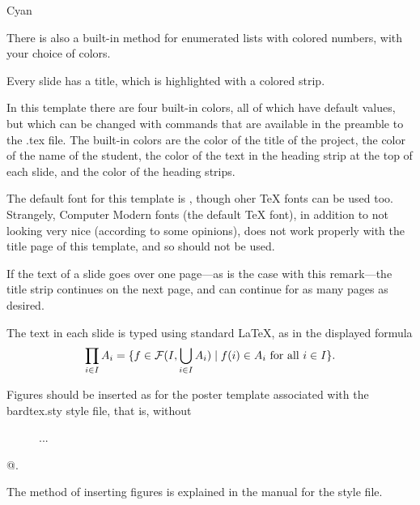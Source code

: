 \documentclass[12pt, oneside, reqno]{article}
\begin{document}
\begin{enumeratecp}{Cyan}
\item 
There is also a built-in method for enumerated lists with colored numbers, with your choice of colors.

\item
Every slide has a title, which is highlighted with a colored strip.

\item
In this template there are four built-in colors, all of which have default values, but which can be changed with commands that are available in the preamble to the .tex file.  The built-in colors are the color of the title of the project, the color of the name of the student, the color of the text in the heading strip at the top of each slide, and the color of the heading strips.

\item
The default font for this template is \verb@fourier@, though oher TeX fonts can be used too.  Strangely, Computer Modern fonts (the default TeX font), in addition to not looking very nice (according to some opinions), does not work properly with the title page of this template, and so should not be used.

\item
If the text of a slide goes over one page---as is the case with this remark---the title strip continues on the next page, and can continue for as many pages as desired.

\end{enumeratecp}



The text in each slide is typed using standard LaTeX, as in the displayed formula
%
\[
\prod_{i \in I} A_i = \{f \in {\mathcal{F}}({I}, {\bigcup_{i \in I} A_i}) \mid f(i) \in A_i \text{ for all } i \in I\}. 
\]
%

Figures should be inserted as for the poster template associated with the \textsf{bardtex.sty} style file, that is, without 
\begin{center}
\verb@\begin{figure} ... \end{figure}@. 
\end{center}
The method of inserting figures is explained in the manual for the style file.
\end{document}
